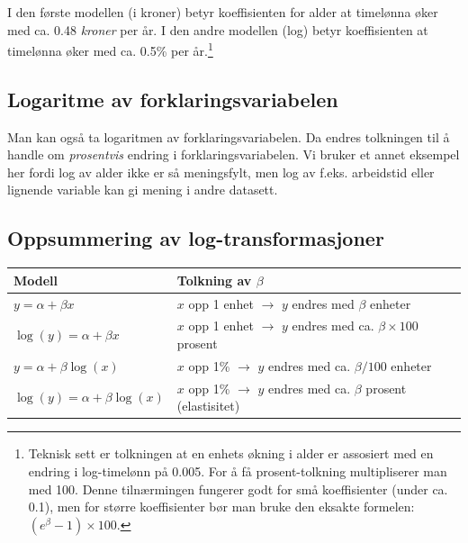 \documentclass[
  norsk,
  letterpaper,
  DIV=11,
  numbers=noendperiod]{scrreprt}
\theoremstyle{definition}
\theoremstyle{remark}
\begin{document}
I den første modellen (i kroner) betyr koeffisienten for alder at
timelønna øker med ca. 0.48 \emph{kroner} per år. I den andre modellen
(log) betyr koeffisienten at timelønna øker med ca. 0.5\% per
år.\footnote{Teknisk sett er tolkningen at en enhets økning i alder er
  assosiert med en endring i log-timelønn på 0.005. For å få
  prosent-tolkning multipliserer man med 100. Denne tilnærmingen
  fungerer godt for små koeffisienter (under ca. 0.1), men for større
  koeffisienter bør man bruke den eksakte formelen:
  \((e^\beta - 1) \times 100\).}

\subsection{Logaritme av
forklaringsvariabelen}\label{logaritme-av-forklaringsvariabelen}

Man kan også ta logaritmen av forklaringsvariabelen. Da endres
tolkningen til å handle om \emph{prosentvis} endring i
forklaringsvariabelen. Vi bruker et annet eksempel her fordi log av
alder ikke er så meningsfylt, men log av f.eks. arbeidstid eller
lignende variable kan gi mening i andre datasett.

\subsection{Oppsummering av
log-transformasjoner}\label{oppsummering-av-log-transformasjoner}

\begin{longtable}[]{@{}
  >{\raggedright\arraybackslash}p{}
  >{\raggedright\arraybackslash}p{}@{}}
\toprule\noalign{}
\begin{minipage}[b]{\linewidth}\raggedright
Modell
\end{minipage} & \begin{minipage}[b]{\linewidth}\raggedright
Tolkning av \(\beta\)
\end{minipage} \\
\midrule\noalign{}
\endhead
\bottomrule\noalign{}
\endlastfoot
\(y = \alpha + \beta x\) & \(x\) opp 1 enhet \(\rightarrow\) \(y\)
endres med \(\beta\) enheter \\
\(\log(y) = \alpha + \beta x\) & \(x\) opp 1 enhet \(\rightarrow\) \(y\)
endres med ca. \(\beta \times 100\) prosent \\
\(y = \alpha + \beta \log(x)\) & \(x\) opp 1\% \(\rightarrow\) \(y\)
endres med ca. \(\beta / 100\) enheter \\
\(\log(y) = \alpha + \beta \log(x)\) & \(x\) opp 1\% \(\rightarrow\)
\(y\) endres med ca. \(\beta\) prosent (elastisitet) \\
\end{longtable}
\end{document}
